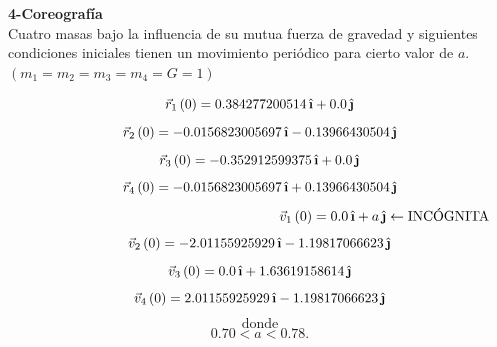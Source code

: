 \documentclass[11pt,letterpaper]{exam}
\newcommand{\ihat}{\,\hat{\textbf{\i}}}
\newcommand{\jhat}{\,\hat{\textbf{\j}}}
\begin{document}
\begin{questions}
\begin{parts}
\end{parts}

\newpage

\question[50] \textbf{4-Coreografía} \\

Cuatro masas bajo la influencia de su mutua fuerza de gravedad y siguientes condiciones iniciales tienen un movimiento periódico para cierto valor de $a$. $(m_1=m_2=m_3=m_4=G=1)$


\[\vec{r}_1\left(0\right)=0.384277200514 \ihat + 0.0 \jhat\]
\[\vec{r}_2\left(0\right)=-0.0156823005697 \ihat -0.13966430504 \jhat\]
\[\vec{r}_3\left(0\right)=-0.352912599375 \ihat + 0.0 \jhat\]
\[\vec{r}_4\left(0\right)=-0.0156823005697 \ihat + 0.13966430504 \jhat\]
\[\quad\quad\quad\quad\quad\quad\quad\quad\quad\quad\quad\quad\quad\quad\quad\quad\quad\quad\vec{v}_1\left(0\right)=0.0 \ihat + a \jhat \leftarrow \textrm{INCÓGNITA}\]
\[\vec{v}_2\left(0\right)=-2.01155925929 \ihat -1.19817066623 \jhat\]
\[\vec{v}_3\left(0\right)=0.0 \ihat + 1.63619158614 \jhat\]
\[\vec{v}_4\left(0\right)=2.01155925929 \ihat -1.19817066623 \jhat\]
\[ \textrm{donde} \]
\[0.70 < a < 0.78.\]

\end{questions}
\end{document}
